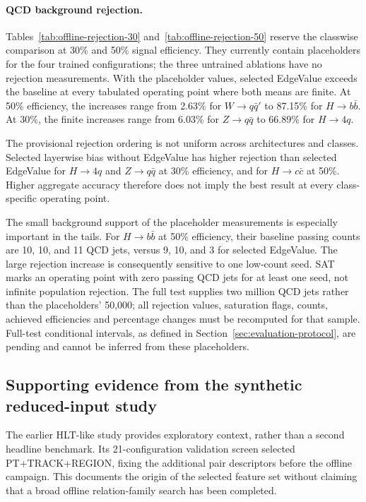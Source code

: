 \paragraph{QCD background rejection.}
Tables~\ref{tab:offline-rejection-30} and~\ref{tab:offline-rejection-50}
reserve the classwise comparison at 30\% and 50\% signal efficiency. They
currently contain placeholders for the four trained configurations; the
three untrained ablations have no rejection measurements. With the
placeholder values, selected EdgeValue exceeds the baseline at every
tabulated operating point where both means are finite. At 50\% efficiency,
the increases range from 2.63\% for $W\to q\bar q'$ to 87.15\% for
$H\to b\bar b$. At 30\%, the finite increases range from 6.03\% for
$Z\to q\bar q$ to 66.89\% for $H\to4q$.




The provisional rejection ordering is not uniform across architectures and
classes. Selected layerwise bias without EdgeValue has higher rejection
than selected EdgeValue for $H\to4q$ and $Z\to q\bar q$ at 30\%
efficiency, and for $H\to c\bar c$ at 50\%. Higher aggregate accuracy
therefore does not imply the best result at every class-specific operating
point.

The small background support of the placeholder measurements is especially
important in the tails. For $H\to b\bar b$ at 50\% efficiency, their
baseline passing counts are 10, 10, and 11 QCD jets, versus 9, 10, and 3
for selected EdgeValue. The large rejection increase is consequently
sensitive to one low-count seed. SAT marks an operating point with zero
passing QCD jets for at least one seed, not infinite population rejection.
The full test supplies two million QCD jets rather than the placeholders'
50,000; all rejection values, saturation flags, counts, achieved
efficiencies and percentage changes must be recomputed for that sample.
Full-test conditional intervals, as defined in
Section~\ref{sec:evaluation-protocol}, are pending and cannot be inferred
from these placeholders.

\subsection{Supporting evidence from the synthetic reduced-input study}
\label{sec:hlt-support-summary}

The earlier HLT-like study provides exploratory context, rather than a
second headline benchmark. Its 21-configuration validation screen selected
PT+TRACK+REGION, fixing the additional pair descriptors before the offline
campaign. This documents the origin of the selected feature set without
claiming that a broad offline relation-family search has been completed.

